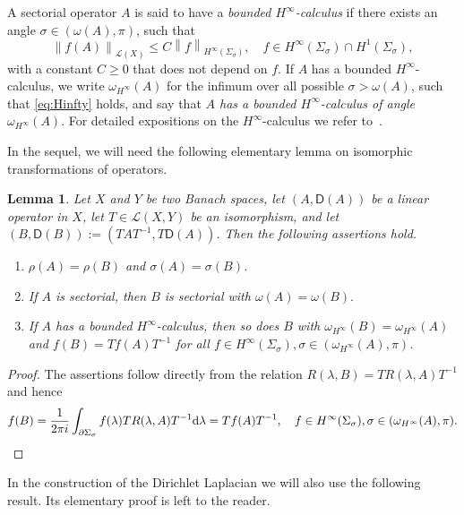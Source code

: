 \documentclass[12pt,a4paper, reqno]{amsart}
\theoremstyle{plain}
\newtheorem{lemma}[theorem]{Lemma}
\theoremstyle{definition}
\theoremstyle{remark}
\numberwithin{equation}{section}
\newcommand{\1}{\mathbbm{1}}
\newcommand{\dd}{\textup{d}}
\newcommand{\sfD}{\ensuremath{\mathsf{D}}}
\newcommand{\scrL}{\ensuremath{\mathscr{L}}}
\newcommand{\nrm}[1]{\left\lVert #1 \right\rVert}
\begin{document}
A sectorial operator $ A $ is said to have a \emph{bounded $ H^\infty $-calculus} if there exists an angle $\sigma\in (\omega(A),\pi)$, such that 
\begin{equation}\label{eq:Hinfty}
\nrm{f(A)}_{\scrL(X)}\le C\nrm{f}_{H^\infty(\Sigma_\sigma)},\quad f\in H^\infty(\Sigma_\sigma) \cap H^1(\Sigma_\sigma),
\end{equation}
with a constant $C\geq0$ that does not depend on $f$. If $A$ has a bounded $H^\infty$-calculus, we write $ \omega_{H^\infty}(A)$ for the infimum over all possible $ \sigma>\omega(A) $, such that \eqref{eq:Hinfty} holds, and say that \emph{$ A $ has a bounded $ H^\infty $-calculus of angle $ \omega_{H^\infty}(A)$}.
For detailed expositions on the $H^\infty$-calculus we refer to~\cite{ Haase2006_FunctionalCalculus,aibs2, Kunstmann2004, PrssSimonett2016}. 

In the sequel, we will need the following elementary lemma on isomorphic transformations of operators. 

\begin{lemma}\label{TransformUnderIsometricIsomorphism} Let $ X $ and $ Y $ be two Banach spaces, let $ (A,\sfD(A)) $ be a linear operator in $ X $, let $ T\in\scrL(X,Y)$ be an isomorphism, and let $(B,\sfD(B)):=(T A T^{-1}, T\sfD(A))$. Then the following assertions hold.
	\begin{enumerate}[label=\textup{(\roman*)}]
 		\item\label{transformation:spectrum:resolvent} $ \rho(A)=\rho(B) $ and $ \sigma(A)=\sigma(B) $.
        \item\label{transformation:sectoriality} If $A$ is sectorial, then $B$ is sectorial with $\omega(A)=\omega(B).$
		\item\label{transformation:calculus} If $A$ has a bounded $H^\infty$-calculus, then so does  $B$ with $\omega_{H^\infty}(B)=\omega_{H^\infty}(A)$  and $f(B)= T f(A) T^{-1}$ for all $f\in H^\infty(\Sigma_\sigma), \sigma\in (\omega_{H^\infty}(A), \pi)$. 
	\end{enumerate}
\end{lemma}
\begin{proof}
    The assertions follow directly from the relation $R(\lambda,B)=TR(\lambda,A)T^{-1}$ and hence 
    \[f(B)=
    \frac{1}{2\pi i}\int_{\partial\Sigma_\sigma} f(\lambda) TR(\lambda,A)T^{-1}\dd \lambda = 
    Tf(A)T^{-1}, \quad f\in H^\infty(\Sigma_\sigma),\sigma\in (\omega_{H^\infty}(A), \pi).\qedhere\]
\end{proof}

In the construction of the Dirichlet Laplacian we will also use the following result. Its elementary proof is left to the reader.
\end{document}

